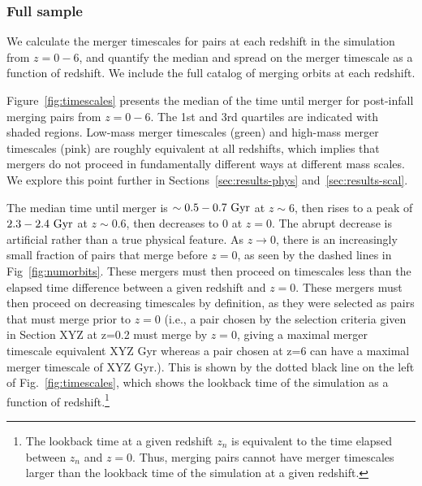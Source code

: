 \documentclass[twocolumn,linenumbers]{aastex631}
\begin{document}
    \subsubsection{Full sample}
        We calculate the merger timescales for pairs at each redshift in the simulation from $z=0-6$, and quantify the median and spread on the merger timescale as a function of redshift. 
        We include the full catalog of merging orbits at each redshift.%
        
        Figure~\ref{fig:timescales} presents the median of the time until merger for post-infall merging pairs from $z=0-6$. 
        The 1st and 3rd quartiles are indicated with shaded regions. 
        Low-mass merger timescales (green) and high-mass merger timescales (pink) are roughly equivalent at all redshifts, which implies that mergers do not proceed in fundamentally different ways at different mass scales. 
        We explore this point further in Sections~\ref{sec:results-phys} and~\ref{sec:results-scal}.
        
        The median time until merger is $\sim0.5-0.7\,\mathrm{\,Gyr}$ at $z\sim6$, then rises to a peak of $2.3-2.4\,\mathrm{\,Gyr}$ at $z\sim0.6$, then decreases to 0 at $z=0$.
        The abrupt decrease is artificial rather than a true physical feature. 
        As $z\to0$, there is an increasingly small fraction of pairs that merge before $z=0$, as seen by the dashed lines in Fig~\ref{fig:numorbits}. 
        These mergers must then proceed on timescales less than the elapsed time difference between a given redshift and $z=0$. These mergers must then proceed on decreasing timescales by definition, as they were selected as pairs that must merge prior to $z=0$ (i.e., a pair chosen by the selection criteria given in Section XYZ at z=0.2 must merge by $z=0$, giving a maximal merger timescale equivalent XYZ Gyr whereas a pair chosen at z=6 can have a maximal merger timescale of XYZ Gyr.). 
        This is shown by the dotted black line on the left of Fig.~\ref{fig:timescales}, which shows the lookback time of the simulation as a function of redshift.\footnote{The lookback time at a given redshift $z_n$ is equivalent to the time elapsed between $z_n$ and $z=0$. Thus, merging pairs cannot have merger timescales larger than the lookback time of the simulation at a given redshift.} %
\end{document}
